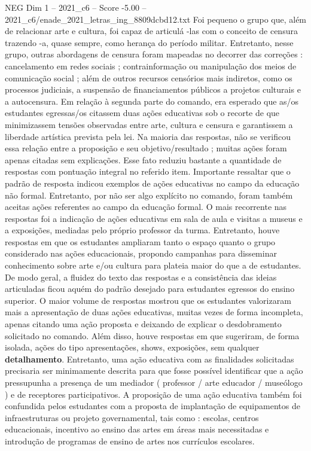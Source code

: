 \begin{textsample}{NEG Dim 1 – 2021\_c6 – Score -5.00 – 2021\_c6/enade\_2021\_letras\_ing\_8809dcbd12.txt}
Foi pequeno o grupo que, além de relacionar arte e cultura, foi capaz de articulá -las com o conceito de censura trazendo -a, quase sempre, como herança do período militar.
Entretanto, nesse grupo, outras abordagens de censura foram mapeadas no decorrer das correções : cancelamento em redes sociais ; contrainformação ou manipulação dos meios de comunicação social ; além de outros recursos censórios mais indiretos, como os processos judiciais, a suspensão de financiamentos públicos a projetos culturais e a autocensura.
Em relação à segunda parte do comando, era esperado que as/os estudantes egressas/os citassem duas ações educativas sob o recorte de que minimizassem tensões observadas entre arte, cultura e censura e garantissem a liberdade artística prevista pela lei.
Na maioria das respostas, não se verificou essa relação entre a proposição e seu objetivo/resultado ; muitas ações foram apenas citadas sem explicações.
Esse fato reduziu bastante a quantidade de respostas com pontuação integral no referido item.
Importante ressaltar que o padrão de resposta indicou exemplos de ações educativas no campo da educação não formal.
Entretanto, por não ser algo explícito no comando, foram também aceitas ações referentes ao campo da educação formal.
O mais recorrente nas respostas foi a indicação de ações educativas em sala de aula e visitas a museus e a exposições, mediadas pelo próprio professor da turma.
Entretanto, houve respostas em que os estudantes ampliaram tanto o espaço quanto o grupo considerado nas ações educacionais, propondo campanhas para disseminar conhecimento sobre arte e/ou cultura para plateia maior do que a de estudantes.
De modo geral, a fluidez do texto das respostas e a consistência das ideias articuladas ficou aquém do padrão desejado para estudantes egressos do ensino superior.
O maior volume de respostas mostrou que os estudantes valorizaram mais a apresentação de duas ações educativas, muitas vezes de forma incompleta, apenas citando uma ação proposta e deixando de explicar o desdobramento solicitado no comando.
Além disso, houve respostas em que sugeriram, de forma isolada, ações do tipo apresentações, shows, exposições, sem qualquer \textbf{detalhamento}.
Entretanto, uma ação educativa com as finalidades solicitadas precisaria ser minimamente descrita para que fosse possível identificar que a ação pressupunha a presença de um mediador ( professor / arte educador / museólogo ) e de receptores participativos.
A proposição de uma ação educativa também foi confundida pelos estudantes com a proposta de implantação de equipamentos de infraestruturas ou projeto governamental, tais como : escolas, centros educacionais, incentivo ao ensino das artes em áreas mais necessitadas e introdução de programas de ensino de artes nos currículos escolares.

\end{textsample}
